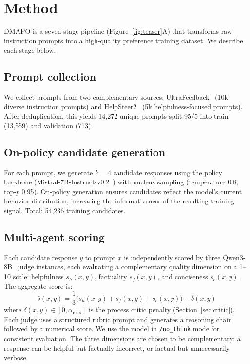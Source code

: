\documentclass{article}
\newcommand{\method}{DMAPO}
\begin{document}
\section{Method}
\label{sec:method}

\method{} is a seven-stage pipeline (Figure~\ref{fig:teaser}A) that transforms raw instruction prompts into a high-quality preference training dataset. We describe each stage below.

\subsection{Prompt collection}

We collect prompts from two complementary sources: UltraFeedback~\citep{cui2023ultrafeedback} (10k diverse instruction prompts) and HelpSteer2~\citep{wang2024helpsteer2} (5k helpfulness-focused prompts). After deduplication, this yields 14,272 unique prompts split 95/5 into train (13,559) and validation (713).

\subsection{On-policy candidate generation}

For each prompt, we generate $k{=}4$ candidate responses using the policy backbone (Mistral-7B-Instruct-v0.2~\citep{jiang2023mistral}) with nucleus sampling (temperature 0.8, top-$p$ 0.95). On-policy generation ensures candidates reflect the model's current behavior distribution, increasing the informativeness of the resulting training signal. Total: 54,236 training candidates.

\subsection{Multi-agent scoring}
\label{sec:scoring}

Each candidate response $y$ to prompt $x$ is independently scored by three Qwen3-8B~\citep{qwen2025qwen3} judge instances, each evaluating a complementary quality dimension on a 1--10 scale: helpfulness $s_h(x,y)$, factuality $s_f(x,y)$, and conciseness $s_c(x,y)$. The aggregate score is:
\begin{equation}
    \bar{s}(x,y) = \frac{1}{3}\bigl(s_h(x,y) + s_f(x,y) + s_c(x,y)\bigr) - \delta(x,y)
    \label{eq:aggregate}
\end{equation}
where $\delta(x,y) \in [0, \alpha_{\max}]$ is the process critic penalty (Section~\ref{sec:critic}). Each judge uses a structured rubric prompt and generates a reasoning chain followed by a numerical score. We use the model in \texttt{/no\_think} mode for consistent evaluation. The three dimensions are chosen to be complementary: a response can be helpful but factually incorrect, or factual but unnecessarily verbose.
\end{document}

